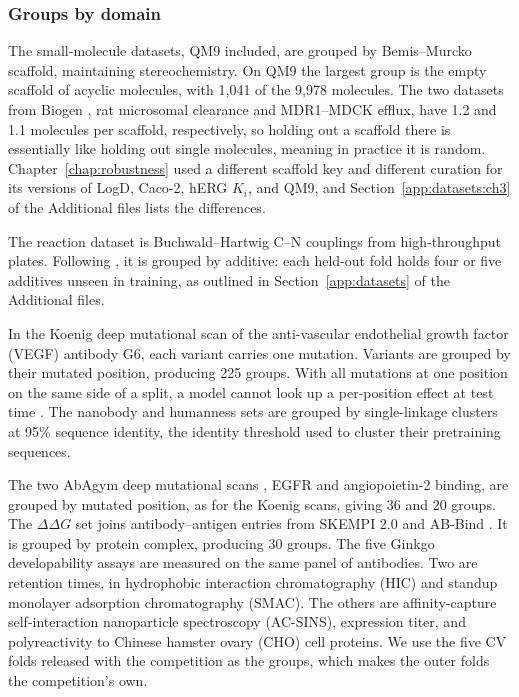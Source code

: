 \subsubsection{Groups by domain}
The small-molecule datasets, QM9 included, are grouped by Bemis--Murcko scaffold, maintaining stereochemistry. On QM9 the largest group is the empty scaffold of acyclic molecules, with 1,041 of the 9,978 molecules. 
The two datasets from Biogen \citep{fang2023}, rat microsomal clearance and MDR1--MDCK efflux, have 1.2 and 1.1 molecules per scaffold, respectively, so holding out a scaffold there is essentially like holding out single molecules, meaning in practice it is random. Chapter~\ref{chap:robustness} used a different scaffold key and different curation for its versions of LogD, Caco-2, hERG $K_i$, and QM9, and Section~\ref{app:datasets:ch3} of the Additional files lists the differences.

The reaction dataset is Buchwald--Hartwig C--N couplings from high-throughput plates. Following \citet{Ahneman2018}, it is grouped by additive: each held-out fold holds four or five additives unseen in training, as outlined in Section~\ref{app:datasets} of the Additional files.

In the Koenig deep mutational scan of the anti-vascular endothelial growth factor (VEGF) antibody G6, each variant carries one mutation.
Variants are grouped by their mutated position, producing 225 groups. With all mutations at one position on the same side of a split, a model cannot look up a per-position effect at test time \citep{Vieira2026}. The nanobody and humanness sets are grouped by single-linkage clusters at 95\% sequence identity, the identity threshold \citet{Kenlay2024} used to cluster their pretraining sequences.

The two AbAgym deep mutational scans \citep{Cia2025AbAgym}, EGFR and angiopoietin-2 binding, are grouped by mutated position, as for the Koenig scans, giving 36 and 20 groups. The $\Delta\Delta G$ set joins antibody--antigen entries from SKEMPI 2.0 \citep{Jankauskaite2019} and AB-Bind \citep{Sirin2016}. It is grouped by protein complex, producing 30 groups. The five Ginkgo developability assays are measured on the same panel of antibodies. Two are retention times, in hydrophobic interaction chromatography (HIC) and standup monolayer adsorption chromatography (SMAC). The others are affinity-capture self-interaction nanoparticle spectroscopy (AC-SINS), expression titer, and polyreactivity to Chinese hamster ovary (CHO) cell proteins. We use the five CV folds released with the competition \citep{vanNiekerk2026} as the groups, which makes the outer folds the competition's own.

